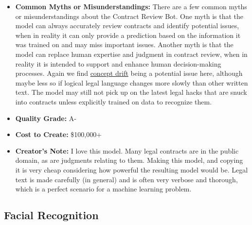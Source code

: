 \begin{itemize}
    \item \textbf{Common Myths or Misunderstandings:} There are a few common myths or misunderstandings about the Contract Review Bot. One myth is that the model can always accurately review contracts and identify potential issues, when in reality it can only provide a prediction based on the information it was trained on and may miss important issues. Another myth is that the model can replace human expertise and judgment in contract review, when in reality it is intended to support and enhance human decision-making processes. Again we find \hyperref[sec:drift]{concept drift} being a potential issue here, although maybe less so if logical legal language changes more slowly than other written text. The model may still not pick up on the latest legal hacks that are snuck into contracts unless explicitly trained on data to recognize them.  
    \item \textbf{Quality Grade:} A-
    \item \textbf{Cost to Create:} \$100,000+
    \item \textbf{Creator's Note:} I love this model. Many legal contracts are in the public domain, as are judgments relating to them. Making this model, and copying it is very cheap considering how powerful the resulting model would be. Legal text is made carefully (in general) and is often very verbose and thorough, which is a perfect scenario for a machine learning problem.  
\end{itemize}

\subsection{Facial Recognition}

